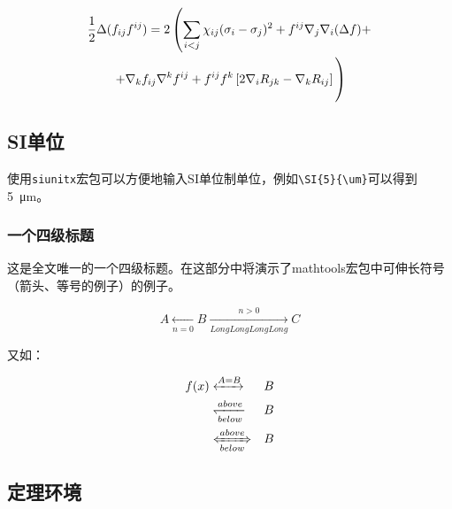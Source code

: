 \begin {multline}
  \frac {1}{2}\Delta (f_{ij}f^{ij})=
  2\left (\sum _{i<j}\chi _{ij}(\sigma _{i}-
    \sigma _{j}) ^{2}+ f^{ij}\nabla _{j}\nabla _{i}(\Delta f)+\right .\\
  \left .+\nabla _{k}f_{ij}\nabla ^{k}f^{ij}+
    f^{ij}f^{k}\left [2\nabla _{i}R_{jk}-
      \nabla _{k}R_{ij}\right ]\vphantom {\sum _{i<j}}\right )
\end{multline}

\subsection{SI单位}

使用\verb+siunitx+宏包可以方便地输入SI单位制单位，例如\verb+\SI{5}{\um}+可以得到\SI{5}{\um}。

\subsubsection{一个四级标题}
\label{sec:depth4}

这是全文唯一的一个四级标题。在这部分中将演示了mathtools宏包中可伸长符号（箭头、等号的例子）的例子。

\begin{displaymath}
    A \xleftarrow[n=0]{} B \xrightarrow[LongLongLongLong]{n>0} C
\end{displaymath}

又如：

\begin{eqnarray}
  f(x) & \xleftrightarrow[]{A=B}  & B \\
  & \xleftharpoondown[below]{above} & B \nonumber \\
  & \xLeftrightarrow[below]{above} & B
\end{eqnarray}


\subsection{定理环境}

